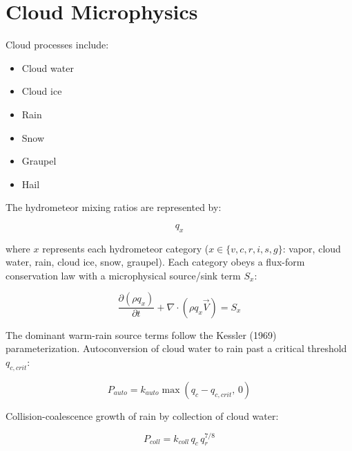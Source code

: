 \section{Cloud Microphysics}


Cloud processes include:


\begin{itemize}

\item Cloud water

\item Cloud ice

\item Rain

\item Snow

\item Graupel

\item Hail

\end{itemize}



The hydrometeor mixing ratios are represented by:


\begin{equation}
q_x
\end{equation}


where $x$ represents each hydrometeor category
($x \in \{v,c,r,i,s,g\}$: vapor, cloud water, rain, cloud ice, snow,
graupel). Each category obeys a flux-form conservation law with a
microphysical source/sink term $S_x$:

\begin{equation}
\frac{\partial(\rho q_x)}{\partial t}
+
\nabla\cdot(\rho q_x \vec{V})
=
S_x
\end{equation}


The dominant warm-rain source terms follow the Kessler (1969)
parameterization. Autoconversion of cloud water to rain past a critical
threshold $q_{c,crit}$:

\begin{equation}
P_{auto} = k_{auto}\max(q_c - q_{c,crit},\,0)
\end{equation}


Collision-coalescence growth of rain by collection of cloud water:

\begin{equation}
P_{coll} = k_{coll}\, q_c\, q_r^{7/8}
\end{equation}
